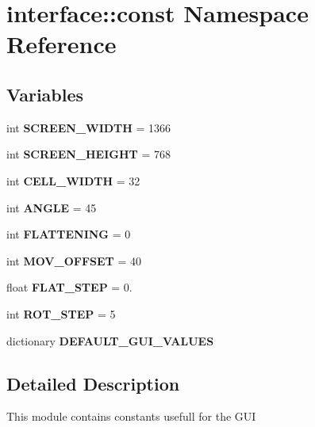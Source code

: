 \hypertarget{namespaceinterface_1_1const}{\section{interface\-:\-:const \-Namespace \-Reference}
\label{namespaceinterface_1_1const}
}
\subsection*{\-Variables}
\begin{DoxyCompactItemize}
\item 
\hypertarget{namespaceinterface_1_1const_a8ff8a908bd526191ed8c624b8cfa492f}{int {\bfseries \-S\-C\-R\-E\-E\-N\-\_\-\-W\-I\-D\-T\-H} = 1366}\label{namespaceinterface_1_1const_a8ff8a908bd526191ed8c624b8cfa492f}

\item 
\hypertarget{namespaceinterface_1_1const_aa22e5189b21079bc616070c5ee0b5164}{int {\bfseries \-S\-C\-R\-E\-E\-N\-\_\-\-H\-E\-I\-G\-H\-T} = 768}\label{namespaceinterface_1_1const_aa22e5189b21079bc616070c5ee0b5164}

\item 
\hypertarget{namespaceinterface_1_1const_ad297c8c194188fafcbd5cbb5195e7dc3}{int {\bfseries \-C\-E\-L\-L\-\_\-\-W\-I\-D\-T\-H} = 32}\label{namespaceinterface_1_1const_ad297c8c194188fafcbd5cbb5195e7dc3}

\item 
\hypertarget{namespaceinterface_1_1const_a0ef6596f0986f41996fcd7103a361301}{int {\bfseries \-A\-N\-G\-L\-E} = 45}\label{namespaceinterface_1_1const_a0ef6596f0986f41996fcd7103a361301}

\item 
\hypertarget{namespaceinterface_1_1const_a1f0908a4a2afca46541051d6032e0cb8}{int {\bfseries \-F\-L\-A\-T\-T\-E\-N\-I\-N\-G} = 0}\label{namespaceinterface_1_1const_a1f0908a4a2afca46541051d6032e0cb8}

\item 
\hypertarget{namespaceinterface_1_1const_ab5feaa48d522f1c0858e8ccf5f6c7320}{int {\bfseries \-M\-O\-V\-\_\-\-O\-F\-F\-S\-E\-T} = 40}\label{namespaceinterface_1_1const_ab5feaa48d522f1c0858e8ccf5f6c7320}

\item 
\hypertarget{namespaceinterface_1_1const_a1d67da912d6be74193e437c57493d154}{float {\bfseries \-F\-L\-A\-T\-\_\-\-S\-T\-E\-P} = 0.}\label{namespaceinterface_1_1const_a1d67da912d6be74193e437c57493d154}

\item 
\hypertarget{namespaceinterface_1_1const_ac574f33f07e039bc502291c88b0f5b2f}{int {\bfseries \-R\-O\-T\-\_\-\-S\-T\-E\-P} = 5}\label{namespaceinterface_1_1const_ac574f33f07e039bc502291c88b0f5b2f}

\item 
\hypertarget{namespaceinterface_1_1const_a88bb4539870ff9c9abdce2aeaabcc4d5}{dictionary {\bfseries \-D\-E\-F\-A\-U\-L\-T\-\_\-\-G\-U\-I\-\_\-\-V\-A\-L\-U\-E\-S}}\label{namespaceinterface_1_1const_a88bb4539870ff9c9abdce2aeaabcc4d5}

\end{DoxyCompactItemize}


\subsection{\-Detailed \-Description}
\begin{DoxyVerb}
    This module contains constants usefull for the GUI
\end{DoxyVerb}
 